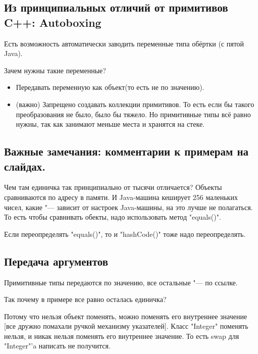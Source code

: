 \subsection{Из принципиальных отличий от примитивов C++: Autoboxing}

Есть возможность автоматически заводить переменные типа обёртки
(с пятой Java).

Зачем нужны такие переменные?
\begin{itemize}
	\item Передавать переменную как объект(то есть не по значению).
	\item (важно) Запрещено создавать коллекции примитивов. 
		То есть если бы такого преобразования не было, 
		было бы тяжело.
		Но примитивные типы всё равно нужны,
		так как занимают меньше места и хранятся на стеке.
\end{itemize}


\subsection{Важные замечания: комментарии к примерам на слайдах.}
Чем там единичка так принципиально от тысячи отличается? 
Объекты сравниваются по адресу в памяти. 
И Java-машина кеширует 256 маленьких чисел,
какие "--- зависит от настроек Java-машины, на это лучше не полагаться. То есть чтобы сравнивать обекты, 
надо использовать метод \java"equals()".

Если переопределять \java"equals()", 
то и \java"hashCode()" тоже надо переопределять.


\subsection{Передача аргументов}
Примитивные типы передаются по значению, все остальные "--- по ссылке.

Так почему в примере все равно осталась единичка?

%
%
%
%
%

Потому что нельзя объект поменять, можно поменять его внутреннее 
значение [все дружно помахали ручкой механизму указателей].
Класс \java"Integer" поменять нельзя, 
и никак нельзя поменять его внутреннее значение.
То есть swap для \java"Integer"'a написать не получится. %


